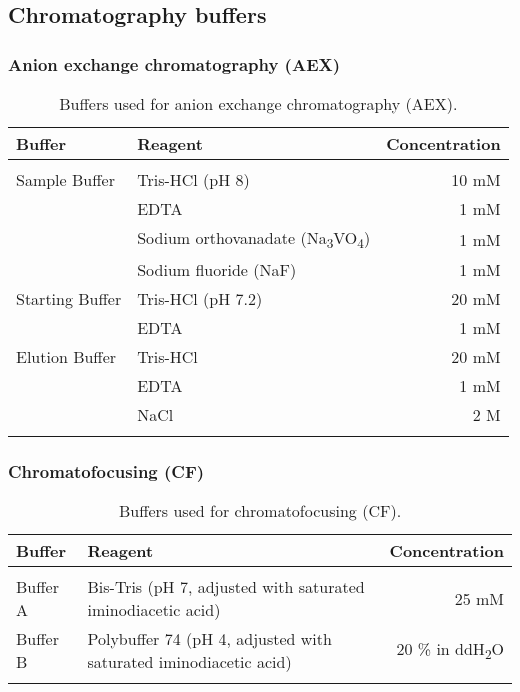 \subsection{Chromatography buffers}
\subsubsection{Anion exchange chromatography (AEX)}

\begin{center}
\begin{table}[H]
\begin{tabular}{l l r}
\textbf{Buffer} & \textbf{Reagent} & \textbf{Concentration}\\
\hline
\\
Sample Buffer & Tris-HCl (pH 8) & 10 mM\\
& EDTA & 1 mM\\
& Sodium orthovanadate (Na\textsubscript{3}VO\textsubscript{4}) & 1 mM\\
& Sodium fluoride (NaF) & 1 mM\\

Starting Buffer & Tris-HCl (pH 7.2) & 20 mM\\
& EDTA & 1 mM\\

Elution Buffer & Tris-HCl & 20 mM\\
& EDTA & 1 mM\\
& NaCl & 2 M\\ 
\\
\end{tabular}
\caption[Anion exchange chromatography (AEX) buffers]{Buffers used for anion exchange chromatography (AEX).}
\label{AEX buffers}
\end{table}

\end{center}


\subsubsection{Chromatofocusing (CF)}

\begin{center}
\begin{table}[H]
\begin{tabular}{l l r}
\textbf{Buffer} & \textbf{Reagent} & \textbf{Concentration}\\
\hline
\\
Buffer A & Bis-Tris (pH 7, adjusted with saturated iminodiacetic acid) & 25 mM\\
Buffer B & Polybuffer 74 (pH 4, adjusted with saturated iminodiacetic acid) & 20 \% in ddH\textsubscript{2}O\\
\\
\end{tabular}
\caption[Chromatofocusing (CF) buffers]{Buffers used for chromatofocusing (CF).}
\label{CF buffers}
\end{table}

\end{center}

